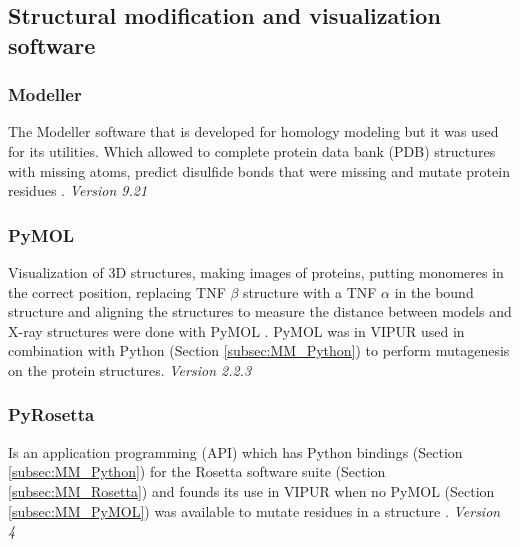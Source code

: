 \subsection{Structural modification and visualization software}

\subsubsection{Modeller}
The Modeller software that is developed for homology modeling but it was used for its utilities. Which allowed to complete protein data bank (PDB) structures with missing atoms, predict disulfide bonds that were missing and mutate protein residues \cite{modeller_about_nodate,eswar_comparative_2006,sali_comparative_1993,fiser_modeling_2000}. 
\label{subsec:MM_Modeller}
\newline
\textit{Version 9.21}

\subsubsection{PyMOL}
Visualization of 3D structures, making images of proteins, putting monomeres in the correct position, replacing TNF $\beta$ structure with a TNF $\alpha$ in the bound structure and aligning the structures to measure the distance between models and X-ray structures were done with PyMOL \cite{schrodinger_pymol_nodate}. PyMOL was in VIPUR used in combination with Python (Section \ref{subsec:MM_Python}) to perform mutagenesis on the protein structures.
\label{subsec:MM_PyMOL}
\newline
\textit{Version 2.2.3}

\subsubsection{PyRosetta}
Is an application programming (API) which has Python bindings (Section \ref{subsec:MM_Python}) for the Rosetta software suite (Section \ref{subsec:MM_Rosetta}) and founds its use in VIPUR when no PyMOL (Section \ref{subsec:MM_PyMOL}) was available to mutate residues in a structure \cite{jeffrey_pyrosetta_nodate}.
\label{subsec:MM_PyRosetta}
\newline
\textit{Version 4}


